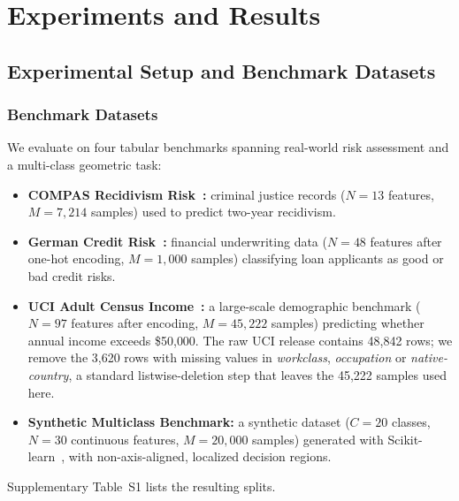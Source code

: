 \section{Experiments and Results}
\label{sec:experiments}

\subsection{Experimental Setup and Benchmark Datasets}
\label{subsec:setup}

\subsubsection{Benchmark Datasets}
We evaluate \modelname{} on four tabular benchmarks spanning real-world risk
assessment and a multi-class geometric task:

\begin{itemize}
    \item \textbf{COMPAS Recidivism Risk~\cite{angwin2016machine}:} criminal
    justice records ($N = 13$ features, $M = 7{,}214$ samples) used to predict
    two-year recidivism.
    \item \textbf{German Credit Risk~\cite{hofmann1994statlog}:} financial
    underwriting data ($N = 48$ features after one-hot encoding, $M = 1{,}000$
    samples) classifying loan applicants as good or bad credit risks.
    \item \textbf{UCI Adult Census Income~\cite{becker1996adult}:} a
    large-scale demographic benchmark ($N = 97$ features after encoding,
    $M = 45{,}222$ samples) predicting whether annual income exceeds \$50{,}000.
    The raw UCI release contains 48{,}842 rows; we remove the 3{,}620 rows with
    missing values in \textit{workclass}, \textit{occupation} or
    \textit{native-country}, a standard listwise-deletion step that leaves the
    45{,}222 samples used here.
    \item \textbf{Synthetic Multiclass Benchmark:} a synthetic dataset ($C = 20$
    classes, $N = 30$ continuous features, $M = 20{,}000$ samples) generated with
    Scikit-learn~\cite{pedregosa2011scikit}, with non-axis-aligned, localized
    decision regions.
\end{itemize}

Supplementary Table~S1 lists the resulting splits.


